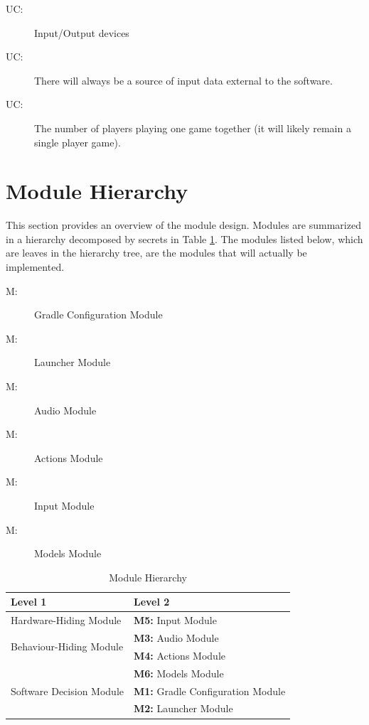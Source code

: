 \documentclass[12pt, titlepage]{article}
\newcounter{ucnum}
\newcommand{\uctheucnum}{UC\theucnum}
\newcounter{mnum}
\newcommand{\mthemnum}{M\themnum}
\begin{document}
\begin{description}
\item[ \uctheucnum \label{ucIO}:] Input/Output devices
\item[ \uctheucnum \label{ucInput}:] There will always be
  a source of input data external to the software.
\item [ \uctheucnum \label{ucSoftware}:] The number of players playing one game together (it will likely remain a single player game).

\end{description}

\section{Module Hierarchy} \label{SecMH}

This section provides an overview of the module design. Modules are summarized
in a hierarchy decomposed by secrets in Table \ref{TblMH}. The modules listed
below, which are leaves in the hierarchy tree, are the modules that will
actually be implemented.

\begin{description}
\item [ \mthemnum \label{m1}:] Gradle Configuration Module
\item [ \mthemnum \label{m2}:] Launcher Module
\item [ \mthemnum \label{m3}:] Audio Module
\item [ \mthemnum \label{m4}:] Actions Module
\item [ \mthemnum \label{m5}:] Input Module
\item [ \mthemnum \label{m6}:] Models Module
\end{description}


\begin{table}[h!]
\centering
\begin{tabular}{p{} p{}}
\toprule
\textbf{Level 1} & \textbf{Level 2}\\
\midrule

{Hardware-Hiding Module}
& \textbf{M5:} Input Module\\
\midrule

\multirow{2}{0.3\textwidth}{Behaviour-Hiding Module}
& \textbf{M3:} Audio Module\\
& \textbf{M4:} Actions Module\\
& \textbf{M6:} Models Module\\
\midrule

\multirow{1}{0.3\textwidth}{Software Decision Module}
& \textbf{M1:} Gradle Configuration Module\\
& \textbf{M2:} Launcher Module\\
\bottomrule

\end{tabular}
\caption{Module Hierarchy}
\label{TblMH}
\end{table}
\end{document}
